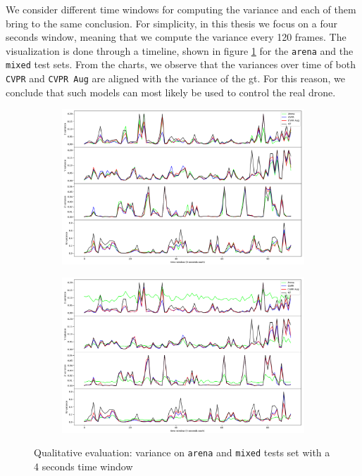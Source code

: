We consider different time windows for computing the variance and each of them bring to the same conclusion. For simplicity, in this thesis we focus on a four seconds window, meaning that we compute the variance every 120 frames. The visualization is done through a timeline, shown in figure \ref{fig:ql-variance} for the \texttt{arena} and the \texttt{mixed} test sets. From the charts, we observe that the variances over time of both \texttt{CVPR} and \texttt{CVPR Aug} are aligned with the variance of the \gls{gt}. For this reason, we conclude that such models can most likely be used to control the real drone.

\begin{figure}[!h]
	\begin{center}
		\begin{subfigure}[h]{0.49\textwidth}
			\centering
			\includegraphics[width=1\textwidth]{"contents/images/06-variance-arena"}
		\end{subfigure}
		\hfill
		\begin{subfigure}[h]{0.49\textwidth}
			\centering
			\includegraphics[width=1\textwidth]{"contents/images/06-variance-mixed"}
		\end{subfigure}
	\end{center}
	\vspace{-0.5cm}
	\caption[Qualitative evaluation: variance on \texttt{arena} and \texttt{mixed} tests set with a 4 seconds time window]{Qualitative evaluation: variance on \texttt{arena} and \texttt{mixed} tests set with a 4 seconds time window}
	\label{fig:ql-variance}
\end{figure}



